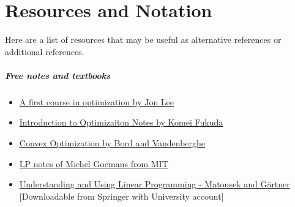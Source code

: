 \documentclass[letter,12pt]{book}
\renewcommand{\0}{\mathbf{0}}
\begin{document}




%	
%	
%
%	
	



	\setlength{\parskip}{3.5pt} %
	\tableofcontents
	\cleardoublepage
	
	\mainmatter
	
	


\chapter{Resources and Notation}
Here are a list of resources that may be useful as alternative references or additional references.

\paragraph{\textbf{Free notes and textbooks}}
\begin{itemize}
\item \href{http://www.optimization-online.org/DB_FILE/2013/12/4161.pdf}{A first course in optimization by Jon Lee}
\item \href{https://people.inf.ethz.ch/fukudak/lect/opt2011/aopt11note1.pdf}{Introduction to Optimizaiton Notes by Komei Fukuda}
\item \href{https://web.stanford.edu/~boyd/cvxbook/}{Convex Optimization by Bord and Vandenberghe}
\item  \href{http://math.mit.edu/~goemans/18310S15/lpnotes310.pdf}{LP notes of Michel Goemans from MIT }
\item \href{https://www.springer.com/gp/book/9783540306979}{Understanding and Using Linear Programming - Matousek and G\"artner} [Downloadable from Springer with University account]
\end{itemize}
\end{document}
